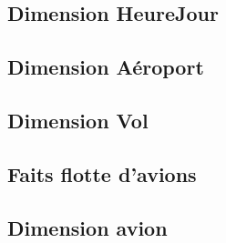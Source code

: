 \documentclass[oneside,13pt,a4paper]{article}
\begin{document}
\subsection{Dimension HeureJour}




\subsection{Dimension Aéroport}



\subsection{Dimension Vol}







\subsection{Faits flotte d'avions}


\subsection{Dimension avion}
\end{document}

